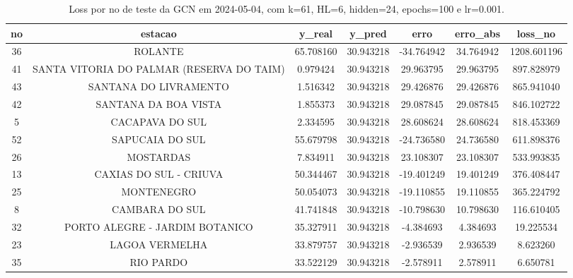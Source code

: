 \begin{table}[h]
\centering
\caption{Loss por no de teste da GCN em 2024-05-04, com k=61, HL=6, hidden=24, epochs=100 e lr=0.001.}
\label{tab:gcn_loss_k61_hl6_h24_e100_d20240504}
\begin{tabular}{ccccccc}
\toprule
no & estacao & y\_real & y\_pred & erro & erro\_abs & loss\_no \\
\midrule
36 & ROLANTE & 65.708160 & 30.943218 & -34.764942 & 34.764942 & 1208.601196 \\
41 & SANTA VITORIA DO PALMAR (RESERVA DO TAIM) & 0.979424 & 30.943218 & 29.963795 & 29.963795 & 897.828979 \\
43 & SANTANA DO LIVRAMENTO & 1.516342 & 30.943218 & 29.426876 & 29.426876 & 865.941040 \\
42 & SANTANA DA BOA VISTA & 1.855373 & 30.943218 & 29.087845 & 29.087845 & 846.102722 \\
5 & CACAPAVA DO SUL & 2.334595 & 30.943218 & 28.608624 & 28.608624 & 818.453369 \\
52 & SAPUCAIA DO SUL & 55.679798 & 30.943218 & -24.736580 & 24.736580 & 611.898376 \\
26 & MOSTARDAS & 7.834911 & 30.943218 & 23.108307 & 23.108307 & 533.993835 \\
13 & CAXIAS DO SUL - CRIUVA & 50.344467 & 30.943218 & -19.401249 & 19.401249 & 376.408447 \\
25 & MONTENEGRO & 50.054073 & 30.943218 & -19.110855 & 19.110855 & 365.224792 \\
8 & CAMBARA DO SUL & 41.741848 & 30.943218 & -10.798630 & 10.798630 & 116.610405 \\
32 & PORTO ALEGRE - JARDIM BOTANICO & 35.327911 & 30.943218 & -4.384693 & 4.384693 & 19.225534 \\
23 & LAGOA VERMELHA & 33.879757 & 30.943218 & -2.936539 & 2.936539 & 8.623260 \\
35 & RIO PARDO & 33.522129 & 30.943218 & -2.578911 & 2.578911 & 6.650781 \\
\bottomrule
\end{tabular}
\end{table}
